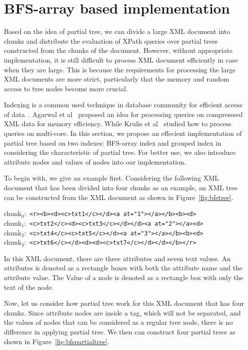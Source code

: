 \section{BFS-array based implementation}
\label{sec:bfsimpl}

Based on the idea of partial tree, we can divide a large XML document into
chunks and distribute the evaluation of XPath queries over partial trees
constructed from the chunks of the document. However, without appropriate
implementation, it is still difficult to process XML document efficiently in
case when they are large. This is because the requirements for processing the
large XML documents are more strict, particularly that the memory and random
access to tree nodes become more crucial.

Indexing is a common used technique in database community for efficient aceess
of data~\cite{JLWO03,PCSS04}. Agarwal et al~\cite{AgKS15} proposed an idea for
processing queries on compresssed XML data for memory efficiency. While Krulis
et al~\cite{KrYa10} studied how to process queries on multi-core.  In this
section, we propose an effecient implementation of partial tree based on two
indexes: BFS-array index and grouped index in considering the characteristic of
partial tree. For better use, we also introduce attribute nodes and values of
nodes into our implementation.

To begin with, we give an example first. Considering the following XML document
that has been divided into four chunks as an example, an XML tree can be
constructed from the XML document as shown in Figure~\ref{fig:bfstree}.

\begin{flushleft}
	chunk$_0$:~\texttt{<r><b><d><c>txt1</c></d><a at="1"></a></b><b><d>}\\
	chunk$_1$:~\texttt{<c>txt2</c><d><c>txt3</c></d></d><a at="2"></a><d>}\\
	chunk$_2$:~\texttt{<c>txt4</c><c>txt5</c></d><a at="3"></a></b><b><d>}\\
	chunk$_3$:~\texttt{<c>txt6</c></d><d><d><c>txt7</c></d></d></b></r>}
\end{flushleft}

In this XML document, there are three attributes and seven text values. An
attributes is denoted as a rectangle boxes with both the attribute name and the
attribute value. The Value of a node is denoted as a rectangle box with only
the text of the node.

Now, let us consider how partial tree work for this XML document that has four
chunks. Since attribute nodes are inside a tag, which will not be separated, and
the values of nodes that can be considered as a regular tree node, there is no
difference in applying partial tree. We then can construct four partial trees as
shown in Figure~\ref{fig:bfspartialtree}.

